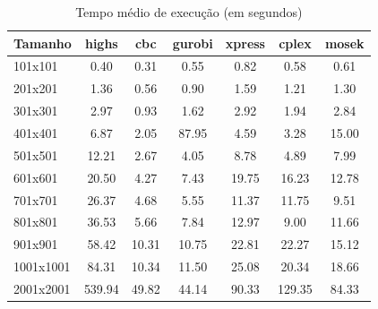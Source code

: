 \begin{table}[htbp]
\centering
\caption{Tempo médio de execução (em segundos)}
\label{tab:tempo_execucao}
\begin{tabular}{lcccccc}
\toprule
Tamanho & highs & cbc & gurobi & xpress & cplex & mosek \\
\midrule
101x101 & 0.40 & 0.31 & 0.55 & 0.82 & 0.58 & 0.61 \\
201x201 & 1.36 & 0.56 & 0.90 & 1.59 & 1.21 & 1.30 \\
301x301 & 2.97 & 0.93 & 1.62 & 2.92 & 1.94 & 2.84 \\
401x401 & 6.87 & 2.05 & 87.95 & 4.59 & 3.28 & 15.00 \\
501x501 & 12.21 & 2.67 & 4.05 & 8.78 & 4.89 & 7.99 \\
601x601 & 20.50 & 4.27 & 7.43 & 19.75 & 16.23 & 12.78 \\
701x701 & 26.37 & 4.68 & 5.55 & 11.37 & 11.75 & 9.51 \\
801x801 & 36.53 & 5.66 & 7.84 & 12.97 & 9.00 & 11.66 \\
901x901 & 58.42 & 10.31 & 10.75 & 22.81 & 22.27 & 15.12 \\
1001x1001 & 84.31 & 10.34 & 11.50 & 25.08 & 20.34 & 18.66 \\
2001x2001 & 539.94 & 49.82 & 44.14 & 90.33 & 129.35 & 84.33 \\
\bottomrule
\end{tabular}
\end{table}